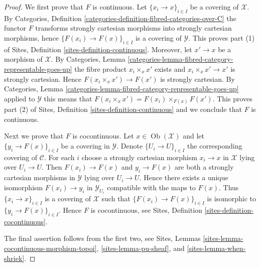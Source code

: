 \documentclass{stacks-project}
\theoremstyle{plain}
\theoremstyle{definition}
\theoremstyle{remark}
\numberwithin{equation}{subsection}
\def\Ob{\mathop{\mathrm{Ob}}\nolimits}
\begin{document}
\begin{proof}
We first prove that $F$ is continuous.
Let $\{x_i \to x\}_{i \in I}$ be a covering of $\mathcal{X}$. By
Categories, Definition \ref{categories-definition-fibred-categories-over-C}
the functor $F$ transforms strongly cartesian morphisms into strongly
cartesian morphisms, hence $\{F(x_i) \to F(x)\}_{i \in I}$ is a covering
of $\mathcal{Y}$. This proves part (1) of
Sites, Definition \ref{sites-definition-continuous}.
Moreover, let $x' \to x$ be a morphism of $\mathcal{X}$. By
Categories, Lemma \ref{categories-lemma-fibred-category-representable-goes-up}
the fibre product $x_i \times_x x'$ exists and $x_i \times_x x' \to x'$
is strongly cartesian. Hence $F(x_i \times_x x') \to F(x')$ is strongly
cartesian. By
Categories, Lemma \ref{categories-lemma-fibred-category-representable-goes-up}
applied to $\mathcal{Y}$ this means that
$F(x_i \times_x x') = F(x_i) \times_{F(x)} F(x')$.
This proves part (2) of
Sites, Definition \ref{sites-definition-continuous}
and we conclude that $F$ is continuous.

\medskip\noindent
Next we prove that $F$ is cocontinuous.
Let $x \in \Ob(\mathcal{X})$ and let $\{y_i \to F(x)\}_{i \in I}$
be a covering in $\mathcal{Y}$. Denote $\{U_i \to U\}_{i \in I}$ the
corresponding covering of $\mathcal{C}$. For each $i$ choose a strongly
cartesian morphism $x_i \to x$ in $\mathcal{X}$ lying over $U_i \to U$.
Then $F(x_i) \to F(x)$ and $y_i \to F(x)$ are both a strongly cartesian
morphisms in $\mathcal{Y}$ lying over $U_i \to U$. Hence there exists
a unique isomorphism $F(x_i) \to y_i$ in $\mathcal{Y}_{U_i}$ compatible
with the maps to $F(x)$. Thus $\{x_i \to x\}_{i \in I}$ is a covering of
$\mathcal{X}$ such that $\{F(x_i) \to F(x)\}_{i \in I}$ is isomorphic to
$\{y_i \to F(x)\}_{i \in I}$. Hence $F$ is cocontinuous, see
Sites, Definition \ref{sites-definition-cocontinuous}.

\medskip\noindent
The final assertion follows from the first two, see
Sites, Lemmas
\ref{sites-lemma-cocontinuous-morphism-topoi},
\ref{sites-lemma-pu-sheaf}, and
\ref{sites-lemma-when-shriek}.
\end{proof}
\end{document}
